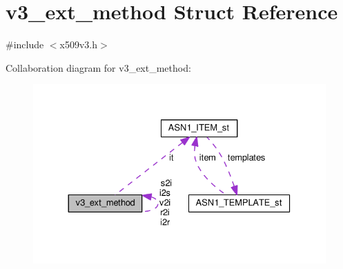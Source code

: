 \hypertarget{structv3__ext__method}{}\section{v3\+\_\+ext\+\_\+method Struct Reference}
\label{structv3__ext__method}


{\ttfamily \#include $<$x509v3.\+h$>$}



Collaboration diagram for v3\+\_\+ext\+\_\+method\+:
\nopagebreak
\begin{figure}[H]
\begin{center}
\leavevmode
\includegraphics[width=330pt]{structv3__ext__method__coll__graph}
\end{center}
\end{figure}
